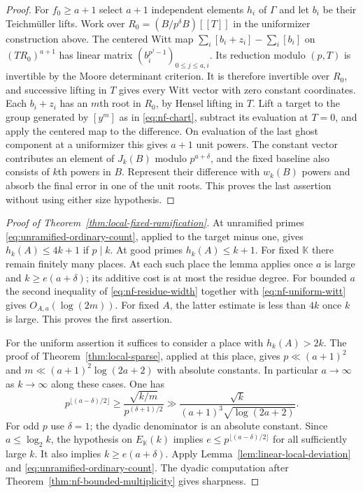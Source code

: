 \documentclass[11pt,letterpaper]{article}
\theoremstyle{definition}
\numberwithin{equation}{section}
\begin{document}
\begin{proof}
For $f_0\ge a+1$ select $a+1$ independent elements $h_i$ of
$\Gamma$ and let $b_i$ be their Teichm\"uller lifts. Work over
$R_0=(B/p^\delta B)[[T]]$ in the uniformizer construction above.
The centered Witt map
$\sum_i[b_i+z_i]-\sum_i[b_i]$ on $(TR_0)^{a+1}$ has linear matrix
$(b_i^{p^j-1})_{0\le j\le a,i}$. Its reduction modulo $(p,T)$
is invertible by the Moore determinant criterion. It is therefore
invertible over $R_0$, and successive lifting in $T$ gives every Witt
vector with zero constant coordinates. Each $b_i+z_i$ has an $m$th
root in $R_0$, by Hensel lifting in $T$. Lift a target to the group
generated by $[y^m]$ as in \eqref{eq:nf-chart}, subtract its evaluation
at $T=0$, and apply the centered map to the difference. On evaluation
of the last ghost component at a uniformizer this gives $a+1$ unit
powers. The constant vector contributes an element of $J_k(B)$
modulo $p^{a+\delta}$, and the fixed baseline also consists of
$k$th powers in $B$. Represent their difference with $w_k(B)$ powers
and absorb the final error in one of the unit roots. This proves the
last assertion without using either size hypothesis.
\end{proof}

\begin{proof}[Proof of Theorem~\ref{thm:local-fixed-ramification}]
At unramified primes \eqref{eq:unramified-ordinary-count}, applied
to the target minus one, gives $h_k(A)\le4k+1$ if $p\mid k$.
At good primes $h_k(A)\le k+1$. For fixed $\mathbb K$ there remain
finitely many places. At each such place the lemma applies once
$a$ is large and $k\ge e(a+\delta)$; its additive cost is at most
the residue degree. For bounded $a$ the second inequality of
\eqref{eq:nf-residue-width} together with \eqref{eq:nf-uniform-witt}
gives $O_{A,a}(\log(2m))$. For fixed $A$, the latter estimate is
less than $4k$ once $k$ is large. This proves the first assertion.

For the uniform assertion it suffices to consider a place with
$h_k(A)>2k$. The proof of Theorem~\ref{thm:local-sparse}, applied
at this place, gives $p\ll(a+1)^2$ and
$m\ll(a+1)^2\log(2a+2)$ with absolute constants.
In particular $a\to\infty$ as $k\to\infty$ along these cases. One has
\[
 p^{\lfloor(a-\delta)/2\rfloor}
 \ge \frac{\sqrt{k/m}}{p^{(\delta+1)/2}}
 \gg \frac{\sqrt k}{(a+1)^3\sqrt{\log(2a+2)}} .
\]
For odd $p$ use $\delta=1$; the dyadic denominator is an absolute
constant. Since $a\le\log_2 k$, the hypothesis on $E_{\mathbb K}(k)$
implies $e\le p^{\lfloor(a-\delta)/2\rfloor}$ for all sufficiently
large $k$. It also implies $k\ge e(a+\delta)$. Apply
Lemma~\ref{lem:linear-local-deviation} and
\eqref{eq:unramified-ordinary-count}. The dyadic computation after
Theorem~\ref{thm:nf-bounded-multiplicity} gives sharpness.
\end{proof}
\end{document}
